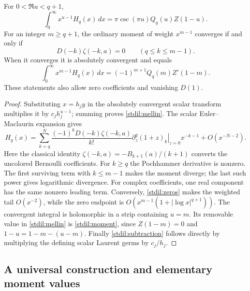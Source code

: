 \begin{theorem}
\label{stdil:criterion}
For $0<\Re u<q+1$,
\begin{equation}\label{stdil:mellin}
 \int_0^\infty x^{u-1}H_q(x)\,dx
    =\pi\csc(\pi u)Q_q(u)Z(1-u).
\end{equation}
For an integer $m\ge q+1$, the ordinary moment of weight $x^{m-1}$
converges if and only if
\begin{equation}\label{stdil:zeros}
 D(-k)\zeta(-k,a)=0\qquad(q\le k\le m-1).
\end{equation}
When it converges it is absolutely convergent and equals
\begin{equation}\label{stdil:moment}
 \int_0^\infty x^{m-1}H_q(x)\,dx
   =(-1)^{m+1}Q_q(m)Z'(1-m).
\end{equation}
These statements also allow zero coefficients and vanishing $D(1)$.
\end{theorem}
\begin{proof}
Substituting $x=h_jy$ in the absolutely convergent scalar transform
multiplies it by $c_jh_j^{u-1}$; summing proves
\eqref{stdil:mellin}. The scalar Euler--Maclaurin expansion gives
\begin{equation}\label{stdil:tail}
 H_q(x)=\sum_{k=q}^{N}\frac{(-1)^kD(-k)\zeta(-k,a)}{k!}
  \left.\partial_z^q(1+z)_k\right|_{z=0}x^{-k-1}
  +O(x^{-N-2}).
\end{equation}
Here the classical identity
$\zeta(-k,a)=-B_{k+1}(a)/(k+1)$ converts the uncolored Bernoulli
coefficients. For $k\ge q$ the Pochhammer derivative is nonzero.
The first surviving term with $k\le m-1$ makes the moment diverge;
the last such power gives logarithmic divergence. For complex coefficients,
one real component has the same nonzero leading term. Conversely,
\eqref{stdil:zeros} makes the weighted tail $O(x^{-2})$, while the
zero endpoint is $O(x^{m-1}(1+|\log x|^{q+1}))$.
The convergent integral is holomorphic in a strip containing $u=m$.
Its removable value in \eqref{stdil:mellin} is
\eqref{stdil:moment}, since $Z(1-m)=0$ and
$1-u=1-m-(u-m)$. Finally \eqref{stdil:subtraction} follows directly
by multiplying the defining scalar Laurent germs by $c_j/h_j$.
\end{proof}

\subsection{A universal construction and elementary moment values}

